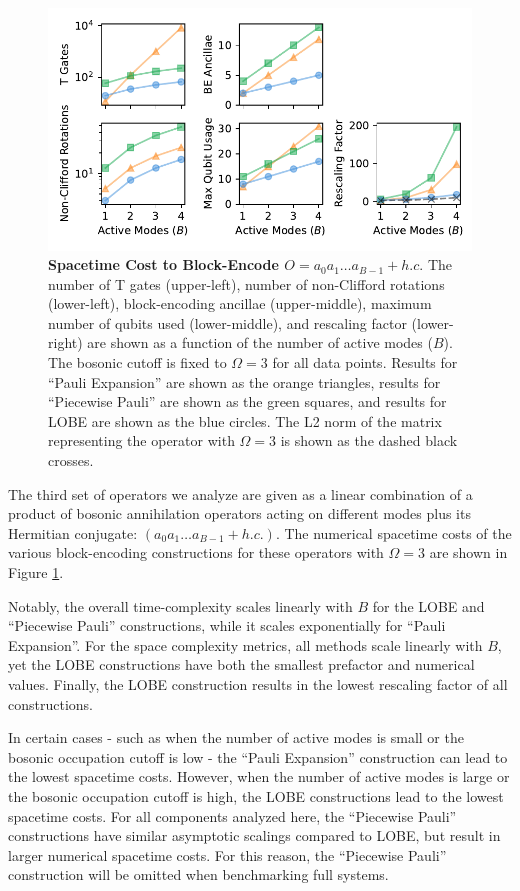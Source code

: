 \begin{figure}
    \centering
    \includegraphics[width=14cm]{figures/bosonic-hc-comparison.pdf}
    \caption{
        \textbf{Spacetime Cost to Block-Encode $O = a_0 a_1 \hdots a_{B-1} + h.c.$}
        The number of T gates (upper-left), number of non-Clifford rotations (lower-left), block-encoding ancillae (upper-middle), maximum number of qubits used (lower-middle), and rescaling factor (lower-right) are shown as a function of the number of active modes ($B$).
        The bosonic cutoff is fixed to $\Omega = 3$ for all data points.
        Results for ``Pauli Expansion'' are shown as the orange triangles, results for ``Piecewise Pauli'' are shown as the green squares, and results for LOBE are shown as the blue circles.
        The L2 norm of the matrix representing the operator with $\Omega = 3$ is shown as the dashed black crosses.
    }
    \label{fig:bosonic-hc-comparison}
\end{figure}

The third set of operators we analyze are given as a linear combination of a product of bosonic annihilation operators acting on different modes plus its Hermitian conjugate: $(a_0 a_1 \hdots a_{B-1} + h.c.)$.
The numerical spacetime costs of the various block-encoding constructions for these operators with $\Omega = 3$ are shown in Figure \ref{fig:bosonic-hc-comparison}.

Notably, the overall time-complexity scales linearly with $B$ for the LOBE and ``Piecewise Pauli'' constructions, while it scales exponentially for ``Pauli Expansion''.
For the space complexity metrics, all methods scale linearly with $B$, yet the LOBE constructions have both the smallest prefactor and numerical values.
Finally, the LOBE construction results in the lowest rescaling factor of all constructions.

In certain cases - such as when the number of active modes is small or the bosonic occupation cutoff is low - the ``Pauli Expansion'' construction can lead to the lowest spacetime costs.
However, when the number of active modes is large or the bosonic occupation cutoff is high, the LOBE constructions lead to the lowest spacetime costs.
For all components analyzed here, the ``Piecewise Pauli'' constructions have similar asymptotic scalings compared to LOBE, but result in larger numerical spacetime costs.
For this reason, the ``Piecewise Pauli'' construction will be omitted when benchmarking full systems.
